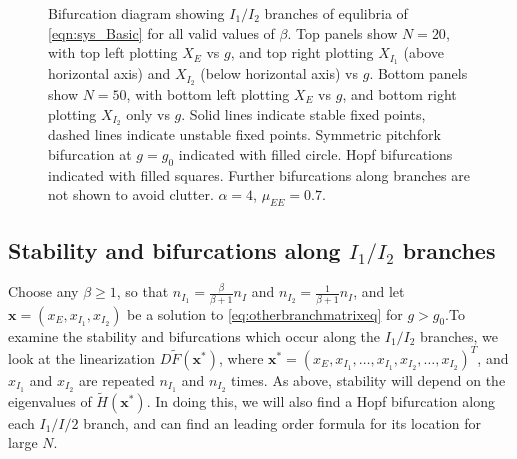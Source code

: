 \documentclass[11pt,reqno]{amsart}
\newcommand{\xvec}{\mathbf{x}}
\begin{document}
\begin{figure}
\begin{tabular}{cc}
    \end{tabular}
    \caption{Bifurcation diagram showing $I_1/I_2$ branches of equlibria of \cref{eqn:sys_Basic} for all valid values of $\beta$. Top panels show $N=20$, with top left plotting $X_E$ vs $g$, and top right plotting $X_{I_1}$ (above horizontal axis) and $X_{I_2}$ (below horizontal axis) vs $g$. Bottom panels show $N=50$, with bottom left plotting $X_E$ vs $g$, and bottom right plotting $X_{I_2}$ only vs $g$. Solid lines indicate stable fixed points, dashed lines indicate unstable fixed points. Symmetric pitchfork bifurcation at $g = g_0$ indicated with filled circle. Hopf bifurcations indicated with filled squares. Further bifurcations along branches are not shown to avoid clutter. $\alpha = 4$, $\mu_{EE} = 0.7$.}
    \label{fig:noclusterBD1}
\end{figure}

\subsection{Stability and bifurcations along $I_1/I_2$ branches}

Choose any $\beta \geq 1$, so that $n_{I_1} = \frac{\beta}{\beta+1}n_I$ and $n_{I_2} = \frac{1}{\beta+1}n_I$, and let $\xvec = (x_E, x_{I_1}, x_{I_2})$ be a solution to \cref{eq:otherbranchmatrixeq} for $g > g_0$.To examine the stability and bifurcations which occur along the $I_1/I_2$ branches, we look at the linearization $D\tilde{F}(\xvec^*)$, where $\xvec^* = (x_E, x_{I_1}, \dots, x_{I_1}, x_{I_2}, \dots, x_{I_2})^T$, and $x_{I_1}$ and $x_{I_2}$ are repeated $n_{I_1}$ and $n_{I_2}$ times. As above, stability will depend on the eigenvalues of $\tilde{H}(\xvec^*)$. In doing this, we will also find a Hopf bifurcation along each $I_1/I/2$ branch, and can find an leading order formula for its location for large $N$.
\end{document}
